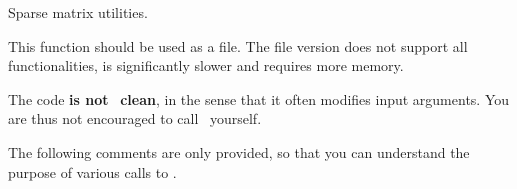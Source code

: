 
  Sparse matrix utilities.


This function should be used as a  file. The  file version does not support all functionalities, is significantly slower and requires more memory. 

The  code {\bf is not} \matlab\ {\bf clean}, in the sense that it often modifies input arguments. You are thus not encouraged to call \sputil\ yourself.

The following comments are only provided, so that you can understand the purpose of various calls to \sputil.

